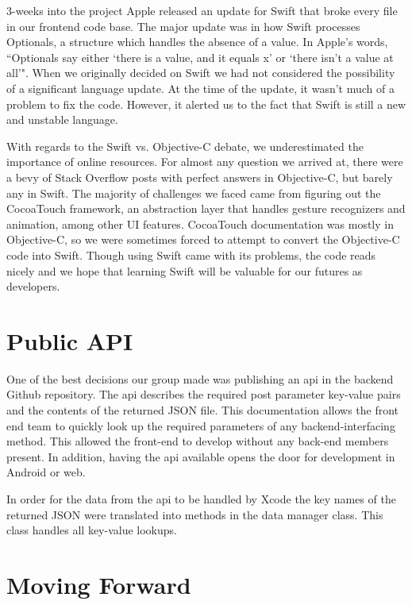 \documentclass[12pt]{article}
\begin{document}
3-weeks into the project Apple released an update for Swift that broke every file in our frontend code base. 
The major update was in how Swift processes Optionals, a structure which handles the absence of a value. 
In Apple's words, ``Optionals say either `there is a value, and it equals x' or `there isn't a value at all'". 
When we originally decided on Swift we had not considered the possibility of a significant language update. 
At the time of the update, it wasn't much of a problem to fix the code. 
However, it alerted us to the fact that Swift is still a new and unstable language. 

With regards to the Swift vs. Objective-C debate, we underestimated the importance of online resources. 
For almost any question we arrived at, there were a bevy of Stack Overflow posts with perfect answers in Objective-C, but barely any in Swift. 
The majority of challenges we faced came from figuring out the CocoaTouch framework, an abstraction layer that handles gesture recognizers and animation, among other UI features. 
CocoaTouch documentation was mostly in Objective-C, so we were sometimes forced to attempt to convert the Objective-C code into Swift. 
Though using Swift came with its problems, the code reads nicely and we hope that learning Swift will be valuable for our futures as developers.

\section{Public API}

One of the best decisions our group made was publishing an api in the backend Github repository. 
The api describes the required post parameter key-value pairs and the contents of the returned JSON file. 
This documentation allows the front end team to quickly look up the required parameters of any backend-interfacing method. 
This allowed the front-end to develop without any back-end members present.
In addition, having the api available opens the door for development in Android or web.

In order for the data from the api to be handled by Xcode the key names of the returned JSON were translated into methods in the data manager class. This class handles all key-value lookups. 

\section{Moving Forward}
\end{document}
